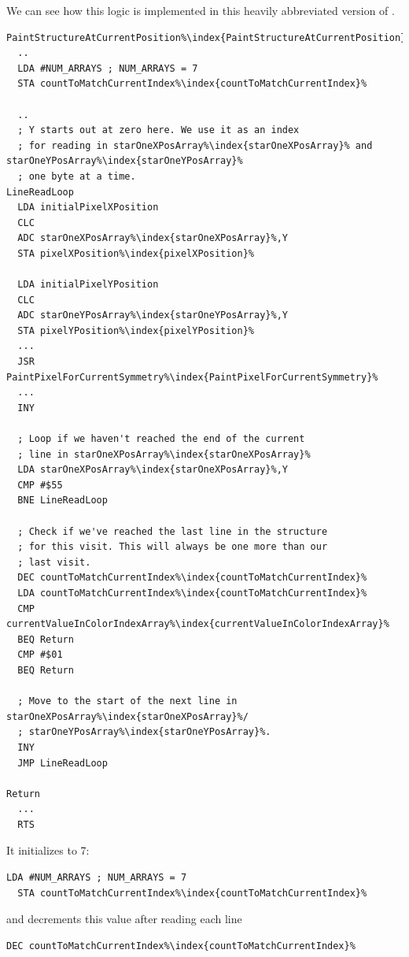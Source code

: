 We can see how this logic is implemented in this heavily abbreviated version of .

\begin{lstlisting}[escapechar=\%]
PaintStructureAtCurrentPosition%\index{PaintStructureAtCurrentPosition}%   
  ..
  LDA #NUM_ARRAYS ; NUM_ARRAYS = 7
  STA countToMatchCurrentIndex%\index{countToMatchCurrentIndex}%

  ..
  ; Y starts out at zero here. We use it as an index
  ; for reading in starOneXPosArray%\index{starOneXPosArray}% and starOneYPosArray%\index{starOneYPosArray}%
  ; one byte at a time.
LineReadLoop   
  LDA initialPixelXPosition
  CLC 
  ADC starOneXPosArray%\index{starOneXPosArray}%,Y
  STA pixelXPosition%\index{pixelXPosition}%

  LDA initialPixelYPosition
  CLC 
  ADC starOneYPosArray%\index{starOneYPosArray}%,Y
  STA pixelYPosition%\index{pixelYPosition}%
  ...
  JSR PaintPixelForCurrentSymmetry%\index{PaintPixelForCurrentSymmetry}%
  ...
  INY 

  ; Loop if we haven't reached the end of the current
  ; line in starOneXPosArray%\index{starOneXPosArray}%
  LDA starOneXPosArray%\index{starOneXPosArray}%,Y
  CMP #$55
  BNE LineReadLoop

  ; Check if we've reached the last line in the structure
  ; for this visit. This will always be one more than our 
  ; last visit.
  DEC countToMatchCurrentIndex%\index{countToMatchCurrentIndex}%
  LDA countToMatchCurrentIndex%\index{countToMatchCurrentIndex}%
  CMP currentValueInColorIndexArray%\index{currentValueInColorIndexArray}%
  BEQ Return
  CMP #$01
  BEQ Return

  ; Move to the start of the next line in starOneXPosArray%\index{starOneXPosArray}%/
  ; starOneYPosArray%\index{starOneYPosArray}%.
  INY 
  JMP LineReadLoop

Return   
  ...
  RTS 
\end{lstlisting}

It initializes  to 7:
\begin{lstlisting}[escapechar=\%]
  LDA #NUM_ARRAYS ; NUM_ARRAYS = 7
  STA countToMatchCurrentIndex%\index{countToMatchCurrentIndex}%
\end{lstlisting}

and decrements this value after reading each line 
\begin{lstlisting}[escapechar=\%]
  DEC countToMatchCurrentIndex%\index{countToMatchCurrentIndex}%
\end{lstlisting}

